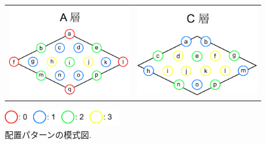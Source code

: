 \begin{figure}[htbp]
    \begin{tabular}{cc}
      \begin{minipage}{0.5\hsize}
        \centering
        \includegraphics[width=80mm]{../method/Alayer.png}
        \label{default}
      \end{minipage} &
      \begin{minipage}{0.5\hsize}
        \centering
        \includegraphics[width=80mm]{../method/Clayer.png}
        \label{default}
      \end{minipage}
    \end{tabular}
    \begin{center}
		\includegraphics[width=50mm]{../method/AClayer.png}
		\caption{配置パターンの模式図.}
		\label{default}
	\end{center}
  \end{figure}




